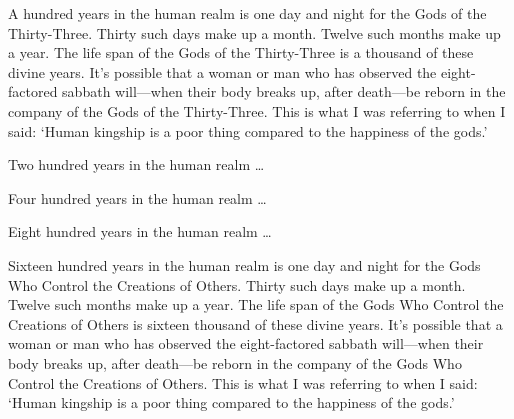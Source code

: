 \documentclass[12pt,openany]{book}%
\begin{document}
A hundred years in the human realm is one day and night for the Gods of the Thirty-Three. Thirty such days make up a month. Twelve such months make up a year. The life span of the Gods of the Thirty-Three is a thousand of these divine years. It’s possible that a woman or man who has observed the eight-factored sabbath will—when their body breaks up, after death—be reborn in the company of the Gods of the Thirty-Three. This is what I was referring to when I said: ‘Human kingship is a poor thing compared to the happiness of the gods.’ 

Two hundred years in the human realm … 

Four hundred years in the human realm … 

Eight hundred years in the human realm … 

Sixteen hundred years in the human realm is one day and night for the Gods Who Control the Creations of Others. Thirty such days make up a month. Twelve such months make up a year. The life span of the Gods Who Control the Creations of Others is sixteen thousand of these divine years. It’s possible that a woman or man who has observed the eight-factored sabbath will—when their body breaks up, after death—be reborn in the company of the Gods Who Control the Creations of Others. This is what I was referring to when I said: ‘Human kingship is a poor thing compared to the happiness of the gods.’ 
\end{document}

